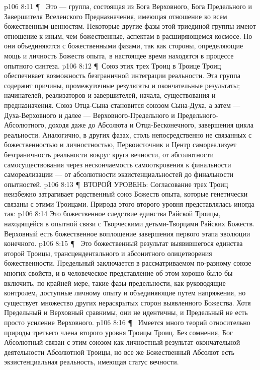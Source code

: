 \vs p106 8:11 \P\ \bibnobreakspace {} Это --- группа, состоящая из Бога Верховного, Бога Предельного и Завершителя Вселенского Предназначения, имеющая отношение ко всем божественным ценностям. Некоторые другие фазы этой триединой группы имеют отношение к иным, чем божественные, аспектам в расширяющемся космосе. Но они объединяются с божественными фазами, так как стороны, определяющие мощь и личность Божеств опыта, в настоящее время находятся в процессе опытного синтеза.
\vs p106 8:12 \P\ Союз этих трех Троиц в Троице Троиц обеспечивает возможность безграничной интеграции реальности. Эта группа содержит причины, промежуточные результаты и окончательные результаты; начинателей, реализаторов и завершителей, начала, существования и предназначения. Союз Отца\hyp{}Сына становится союзом Сына\hyp{}Духа, а затем --- Духа\hyp{}Верховного и далее --- Верховного\hyp{}Предельного и Предельного\hyp{}Абсолютного, доходя даже до Абсолюта и Отца\hyp{}Бесконечного, завершения цикла реальности. Аналогично, в других фазах, столь непосредственно не связанных с божественностью и личностностью, Первоисточник и Центр самореализует безграничность реальности вокруг круга вечности, от абсолютности самосуществования через нескончаемость самооткровения к финальности самореализации --- от абсолютности экзистенциальностей до финальности опытностей.
\vs p106 8:13 \P\ ВТОРОЙ УРОВЕНЬ: Согласование трех Троиц неизбежно затрагивает родственный союз Божеств опыта, которые генетически связаны с этими Троицами. Природа этого второго уровня представлялась иногда так:
\vs p106 8:14 \bibnobreakspace {} Это божественное следствие единства Райской Троицы, находящейся в опытной связи с Творческими детьми\hyp{}Творцами Райских Божеств. Верховный есть божественное воплощение завершения первого этапа эволюции конечного.
\vs p106 8:15 \P\ \bibnobreakspace {} Это божественный результат выявившегося единства второй Троицы, трансцендентального и абсонитного олицетворения божественности. Предельный заключается в рассматриваемом по\hyp{}разному союзе многих свойств, и в человеческое представление об этом хорошо было бы включить, по крайней мере, такие фазы предельности, как руководящие контролем, доступные личному опыту и объединяющие путем напряжения, но существует множество других нераскрытых сторон выявленного Божества. Хотя Предельный и Верховный сравнимы, они не идентичны, и Предельный не есть просто усиление Верховного.
\vs p106 8:16 \P\ \bibnobreakspace {} Имеется много теорий относительно природы третьего члена второго уровня Троицы Троиц. Без сомнения, Бог Абсолютный связан с этим союзом как личностный результат окончательной деятельности Абсолютной Троицы, но все же Божественный Абсолют есть экзистенциальная реальность, имеющая статус вечности.
